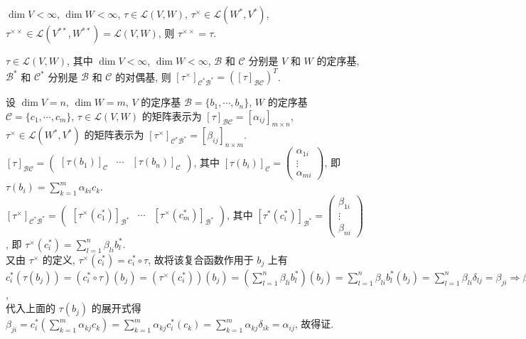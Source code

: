 \documentclass{note}
\begin{document}
\begin{thm}[(课本定理 3.18)]
    $\dim V<\infty$, $\dim W<\infty$, $\tau\in\mathcal{L}(V,W)$, $\tau^{\times}\in\mathcal{L}(W^*,V^*)$, $\tau^{\times\times}\in\mathcal{L}(V^{**},W^{**})=\mathcal{L}(V,W)$, 则 $\tau^{\times\times}=\tau$.
\end{thm}

\begin{thm}[(课本定理 3.22)]
    $\tau\in\mathcal{L}(V,W)$, 其中 $\dim V<\infty$, $\dim W<\infty$, $\mathcal{B}$ 和 $\mathcal{C}$ 分别是 $V$ 和 $W$ 的定序基, $\mathcal{B}^*$ 和 $\mathcal{C}^*$ 分别是 $\mathcal{B}$ 和 $\mathcal{C}$ 的对偶基, 则 $[\tau^{\times}]_{\mathcal{C^*B^*}}=([\tau]_{\mathcal{BC}})^T$.
\end{thm}
\begin{pf}
    设 $\dim V=n$, $\dim W=m$, $V$ 的定序基 $\mathcal{B}=\{b_1,\cdots,b_n\}$, $W$ 的定序基 $\mathcal{C}=\{c_1,\cdots,c_m\}$, $\tau\in\mathcal{L}(V,W)$ 的矩阵表示为 $[\tau]_{\mathcal{BC}}=[\alpha_{ij}]_{m\times n}$, $\tau^{\times}\in\mathcal{L}(W^*,V^*)$ 的矩阵表示为 $[\tau^{\times}]_{\mathcal{C^*B^*}}=[\beta_{ij}]_{n\times m}$.\\
    $[\tau]_{\mathcal{BC}}=\begin{pmatrix}
        [\tau(b_1)]_{\mathcal{C}}&\cdots&[\tau(b_n)]_{\mathcal{C}}
    \end{pmatrix}$, 其中 $[\tau(b_i)]_{\mathcal{C}}=\begin{pmatrix}
        \alpha_{1i}\\
        \vdots\\
        \alpha_{mi}
    \end{pmatrix}$, 即 $\tau(b_i)=\sum_{k=1}^m\alpha_{ki}c_k$.\\
    $[\tau^{\times}]_{\mathcal{C^*B^*}}=\begin{pmatrix}
        [\tau^{\times}(c_1^*)]_{\mathcal{B^*}}&\cdots&[\tau^{\times}(c_m^*)]_{\mathcal{B^*}}
    \end{pmatrix}$, 其中 $[\tau^*(c_i^*)]_{\mathcal{B}^*}=\begin{pmatrix}
        \beta_{1i}\\
        \vdots\\
        \beta_{ni}
    \end{pmatrix}$, 即 $\tau^{\times}(c_i^*)=\sum_{l=1}^n\beta_{li}b_l^*$.\\
    又由 $\tau^{\times}$ 的定义, $\tau^{\times}(c_i^*)=c_i^*\circ\tau$, 故将该复合函数作用于 $b_j$ 上有 $c_i^*(\tau(b_j))=(c_i^*\circ\tau)(b_j)=(\tau^{\times}(c_i^*))(b_j)=\left(\sum_{l=1}^n\beta_{li}b_l^*\right)(b_j)=\sum_{l=1}^n\beta_{li}b_l^*(b_j)=\sum_{l=1}^n\beta_{li}\delta_{lj}=\beta_{ji}\Longrightarrow\beta_{ji}=c_i^*(\tau(b_j))$,\\
    代入上面的 $\tau(b_j)$ 的展开式得 $\beta_{ji}=c_i^*\left(\sum_{k=1}^m\alpha_{kj}c_k\right)=\sum_{k=1}^m\alpha_{kj}c_i^*(c_k)=\sum_{k=1}^m\alpha_{kj}\delta_{ik}=\alpha_{ij}$, 故得证.
\end{pf}
\ifx\allfiles\undefined
\end{document}
